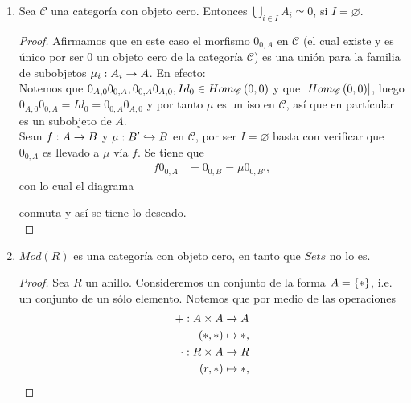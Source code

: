 \documentclass{article}
\begin{document}
\begin{enumerate}[label=\textbf{Ej \arabic*.}]
\begin{proof}
			es un diagrama conmutativo, por lo que existe un único \\$g':Im(f\beta_1)\to B_1$, tal que $\nu_2\nu_1 g'=\mu$\,\, y \,\,$gf'=\beta_2$ dado por la\\
			propiedad universal de las imagenes. Mas aún, notemos que $g'$ es mono, pues $\mu$ es mono y $\mu=\nu_2\nu_1g'$. 
			Así  $f\beta_1=\nu_2\nu_1\beta_2$. \\
			Por lo que $Im(f\beta_1)=f(f^{-1}(B_1))\subseteq B_1.$\\
		\end{proof}
		\item Sea $\mathscr{C}$ una categoría con objeto cero. Entonces $\bigcup\limits_{i\in I}A_i\simeq 0$, si $I=\varnothing$.
		\begin{proof}
			Afirmamos que en este caso el morfismo $0_{0,A}$  en $\mathscr{C}$ (el cual existe y es único por ser $0$ un objeto cero de la categoría $\mathscr{C}$) es una unión para la familia de subobjetos $\catarrow{\mu_i}{A_i}{A}{}$. En efecto:\\
			Notemos que $0_{A,0}0_{0,A},0_{0,A}0_{A,0},  Id_0\in Hom_{\mathscr{C}}\left(0,0\right)$ y que $\left|Hom_{\mathscr{C}}\left(0,0\right)\right|$, luego $0_{A,0}0_{0,A}=Id_0=0_{0,A}0_{A,0}$ y por tanto $\mu$ es un iso en $\mathscr{C}$, así que en partícular es un subobjeto de $A$.\\
			Sean $\catarrow{f}{A}{B}{}$ y $\catarrow{\mu}{B'}{B}{m}$ en $\mathscr{C}$, por ser $I=\varnothing$ basta con verificar que $0_{0,A}$ es llevado a $\mu$ vía $f$. Se tiene que
			\begin{align*}
				f0_{0,A}&=0_{0,B}=\mu 0_{0,B'},
			\end{align*}
			con lo cual el diagrama
			\begin{center}
			\end{center}
		conmuta y así se tiene lo deseado.\\
		\end{proof}
		\item $Mod(R)$ es una categoría con objeto cero, en tanto que $Sets$ no lo es.
		\begin{proof}
			 Sea $R$ un anillo. Consideremos un conjunto de la forma $A=\left\{*\right\}$, i.e. un conjunto de un sólo elemento. Notemos que por medio de las operaciones
			\begin{align*}
				\descapp{+}{A\times A}{A}{\lrprth{*,*}}{*}{,}\\
				\descapp{\cdot}{R\times A}{R}{\lrprth{r,*}}{*}{,}\\

\end{align*}
\end{proof}
\end{enumerate}
\end{document}
